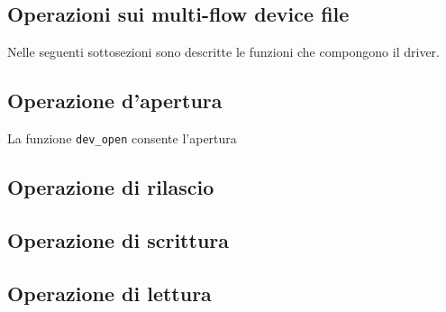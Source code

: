 \documentclass[oneside]{article}
\begin{document}
\subsection{Operazioni sui multi-flow device file}
Nelle seguenti sottosezioni sono descritte le funzioni che compongono il driver.

\subsection{Operazione d'apertura}
La funzione \texttt{dev\_open} consente l'apertura 

\subsection{Operazione di rilascio}
\subsection{Operazione di scrittura}
\subsection{Operazione di lettura}
\end{document}
